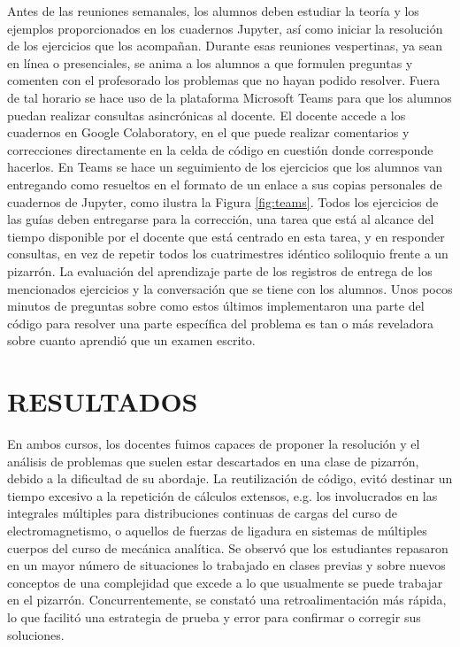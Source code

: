 \documentclass[a4paper]{fodami}        %
\begin{document}
Antes de las reuniones semanales, los alumnos deben estudiar la teoría y los ejemplos proporcionados en los cuadernos Jupyter, así como iniciar la resolución de los ejercicios que los acompañan.
Durante esas reuniones vespertinas, ya sean en línea o presenciales, se anima a los alumnos a que formulen preguntas y comenten con el profesorado los problemas que no hayan podido resolver.
Fuera de tal horario se hace uso de la plataforma Microsoft Teams para que los alumnos puedan realizar consultas asincrónicas al docente.
El docente accede a los cuadernos en Google Colaboratory, en el que puede realizar comentarios y correcciones directamente en la celda de código en cuestión donde corresponde hacerlos.
En Teams se hace un seguimiento de los ejercicios que los alumnos van entregando como resueltos en el formato de un enlace a sus copias personales de cuadernos de Jupyter, como ilustra la Figura \ref{fig:teams}.
Todos los ejercicios de las guías deben entregarse para la corrección, una tarea que está al alcance del tiempo disponible por el docente que está centrado en esta tarea, y en responder consultas, en vez de repetir todos los cuatrimestres idéntico soliloquio frente a un pizarrón.
La evaluación del aprendizaje parte de los registros de entrega de los mencionados ejercicios y la conversación que se tiene con los alumnos.
Unos pocos minutos de preguntas sobre como estos últimos implementaron una parte del código para resolver una parte específica del problema es tan o más reveladora sobre cuanto aprendió que un examen escrito.





\section{RESULTADOS}

En ambos cursos, los docentes fuimos capaces de proponer la resolución y el análisis de problemas que suelen estar descartados en una clase de pizarrón, debido a la dificultad de su abordaje.
La reutilización de código, evitó destinar un tiempo excesivo a la repetición de cálculos extensos, e.g. los involucrados en las integrales múltiples para distribuciones continuas de cargas del curso de electromagnetismo, o aquellos de fuerzas de ligadura en sistemas de múltiples cuerpos del curso de mecánica analítica.
Se observó que los estudiantes repasaron en un mayor número de situaciones lo trabajado en clases previas y sobre nuevos conceptos de una complejidad que excede a lo que usualmente se puede trabajar en el pizarrón.
Concurrentemente, se constató una retroalimentación más rápida, lo que facilitó una estrategia de prueba y error para confirmar o corregir sus soluciones.
\end{document}
